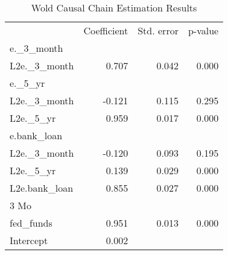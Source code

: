 \begin{table}[!h]
\caption{Wold Causal Chain Estimation Results}
\centering
\begin{tabular}{llll}
\cline{1-4}
\multicolumn{1}{c}{} &
  \multicolumn{1}{|r}{Coefficient} &
  \multicolumn{1}{r}{Std. error} &
  \multicolumn{1}{r}{p-value} \\
\cline{1-4}
\multicolumn{1}{l}{e.\_3\_month} &
  \multicolumn{1}{|r}{} &
  \multicolumn{1}{r}{} &
  \multicolumn{1}{r}{} \\
\multicolumn{1}{l}{\hspace{1em}L2e.\_3\_month} &
  \multicolumn{1}{|r}{0.707} &
  \multicolumn{1}{r}{0.042} &
  \multicolumn{1}{r}{0.000} \\
\multicolumn{1}{l}{e.\_5\_yr} &
  \multicolumn{1}{|r}{} &
  \multicolumn{1}{r}{} &
  \multicolumn{1}{r}{} \\
\multicolumn{1}{l}{\hspace{1em}L2e.\_3\_month} &
  \multicolumn{1}{|r}{-0.121} &
  \multicolumn{1}{r}{0.115} &
  \multicolumn{1}{r}{0.295} \\
\multicolumn{1}{l}{\hspace{1em}L2e.\_5\_yr} &
  \multicolumn{1}{|r}{0.959} &
  \multicolumn{1}{r}{0.017} &
  \multicolumn{1}{r}{0.000} \\
\multicolumn{1}{l}{e.bank\_loan} &
  \multicolumn{1}{|r}{} &
  \multicolumn{1}{r}{} &
  \multicolumn{1}{r}{} \\
\multicolumn{1}{l}{\hspace{1em}L2e.\_3\_month} &
  \multicolumn{1}{|r}{-0.120} &
  \multicolumn{1}{r}{0.093} &
  \multicolumn{1}{r}{0.195} \\
\multicolumn{1}{l}{\hspace{1em}L2e.\_5\_yr} &
  \multicolumn{1}{|r}{0.139} &
  \multicolumn{1}{r}{0.029} &
  \multicolumn{1}{r}{0.000} \\
\multicolumn{1}{l}{\hspace{1em}L2e.bank\_loan} &
  \multicolumn{1}{|r}{0.855} &
  \multicolumn{1}{r}{0.027} &
  \multicolumn{1}{r}{0.000} \\
\multicolumn{1}{l}{3 Mo} &
  \multicolumn{1}{|r}{} &
  \multicolumn{1}{r}{} &
  \multicolumn{1}{r}{} \\
\multicolumn{1}{l}{\hspace{1em}fed\_funds} &
  \multicolumn{1}{|r}{0.951} &
  \multicolumn{1}{r}{0.013} &
  \multicolumn{1}{r}{0.000} \\
\multicolumn{1}{l}{\hspace{1em}Intercept} &
  \multicolumn{1}{|r}{0.002} &

\end{tabular}
\end{table}
